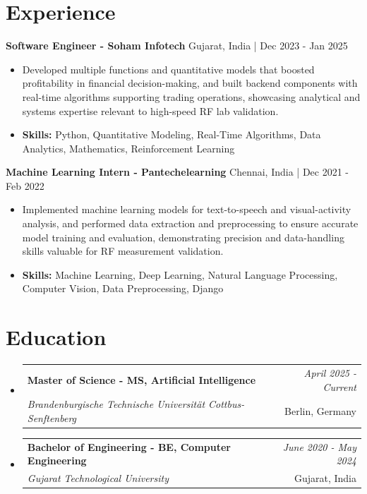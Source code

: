 \documentclass[a4paper,11pt]{article}
\makeatletter
\newcommand{\resumeSubheading}[4]{
\vspace{0.5mm}\item
    \begin{tabular*}{\linewidth}[t]{l@{\extracolsep{\fill}}r}
        \textbf{#1} & \textit{\footnotesize{#4}} \\
        \textit{\footnotesize{#3}} &  \footnotesize{#2}\\
    \end{tabular*}
    \vspace{-2.4mm}
}
\makeatother
\begin{document}
\section{\textbf{Experience}}


\vspace{1mm}
  \textbf{Software Engineer - Soham Infotech} \hfill Gujarat, India | Dec 2023 - Jan 2025
\vspace{-1.5mm} %
\begin{itemize}
  \item Developed multiple functions and quantitative models that boosted profitability in financial decision-making, and built backend components with real-time algorithms supporting trading operations, showcasing analytical and systems expertise relevant to high-speed RF lab validation.

\vspace{-2mm}
  \item \textbf{Skills:} Python, Quantitative Modeling, Real-Time Algorithms, Data Analytics, Mathematics, Reinforcement Learning
\end{itemize}

\vspace{1mm}
  \textbf{Machine Learning Intern - Pantechelearning} \hfill Chennai, India | Dec 2021 - Feb 2022
\vspace{-1.5mm} %
\begin{itemize}
  \item Implemented machine learning models for text-to-speech and visual-activity analysis, and performed data extraction and preprocessing to ensure accurate model training and evaluation, demonstrating precision and data-handling skills valuable for RF measurement validation.
\vspace{-2mm}
  \item \textbf{Skills:} Machine Learning, Deep Learning, Natural Language Processing, Computer Vision, Data Preprocessing, Django
\end{itemize}\section{\textbf{Education}}
\vspace{-0.4mm}

\begin{itemize}[leftmargin=0.15in, label={}]
\resumeSubheading
{Master of Science - MS, Artificial Intelligence }{Berlin, Germany}
{Brandenburgische Technische Universität Cottbus-Senftenberg  }{April 2025 - Current}

\vspace{1.0mm} %
\resumeSubheading
{Bachelor of Engineering - BE, Computer Engineering  }{Gujarat, India}
{Gujarat Technological University }{June 2020 - May 2024}

\end{itemize}
\end{document}
